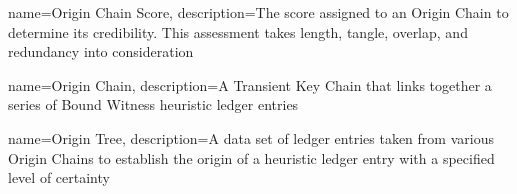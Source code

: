 \documentclass{article}
\begin{document}
{
    name={Origin Chain Score},
    description={The score assigned to an Origin Chain to determine its credibility. This assessment takes length, tangle, overlap, and redundancy into consideration}
}

{
    name={Origin Chain},
    description={A Transient Key Chain that links together a series of Bound Witness heuristic ledger entries}
}

{
    name={Origin Tree},
    description={A data set of ledger entries taken from various Origin Chains to establish the origin of a heuristic ledger entry with a specified level of certainty}
}




\printglossaries

\end{document}
